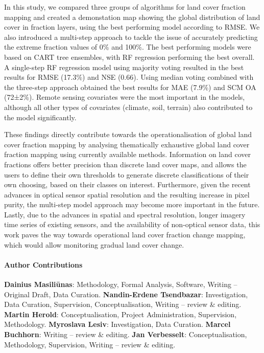 \documentclass[review,authoryear,3p]{elsarticle}
\newcommand{\minisection}[1]{\paragraph{#1}}%
\begin{document}
In this study, we compared three groups of algorithms for land cover fraction mapping and created a demonstation map showing the global distribution of land cover in fraction layers, using the best performing model according to \gls{RMSE}.
We also introduced a multi-step approach to tackle the issue of accurately predicting the extreme fraction values of 0\% and 100\%.
The best performing models were based on \gls{CART} tree ensembles, with \gls{RF} regression performing the best overall.
A single-step \gls{RF} regression model using majority voting resulted in the best results for RMSE (17.3\%) and \gls{NSE} (0.66).
Using median voting combined with the three-step approach obtained the best results for \gls{MAE} (7.9\%) and \gls{SCM} \gls{OA} (72±2\%).
Remote sensing covariates were the most important in the models, although all other types of covariates (climate, soil, terrain) also contributed to the model significantly.

These findings directly contribute towards the operationalisation of global land cover fraction mapping by analysing thematically exhaustive global land cover fraction mapping using currently available methods.
Information on land cover fractions offers better precision than discrete land cover maps, and allows the users to define their own thresholds to generate discrete classifications of their own choosing, based on their classes on interest.
Furthermore, given the recent advances in optical sensor spatial resolution and the resulting increase in pixel purity, the multi-step model approach may become more important in the future.
Lastly, due to the advances in spatial and spectral resolution, longer imagery time series of existing sensors, and the availability of non-optical sensor data, this work paves the way towards operational land cover fraction change mapping, which would allow monitoring gradual land cover change.

\minisection{Author Contributions}
\textbf{Dainius Masiliūnas}: Methodology, Formal Analysis, Software, Writing – Original Draft, Data Curation. \textbf{Nandin-Erdene Tsendbazar}: Investigation, Data Curation, Supervision, Conceptualisation, Writing – review \& editing. \textbf{Martin Herold}: Conceptualisation, Project Administration, Supervision, Methodology. \textbf{Myroslava Lesiv}: Investigation, Data Curation. \textbf{Marcel Buchhorn}: Writing – review \& editing. \textbf{Jan Verbesselt}: Conceptualisation, Methodology, Supervision, Writing – review \& editing.
\end{document}
